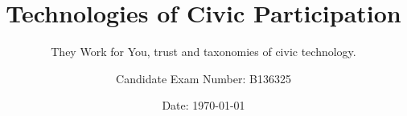 \title{Technologies of Civic Participation}
\subtitle{They Work for You, trust and taxonomies of civic technology.}

\author{Candidate Exam Number: B136325}


\date{Date: \today}